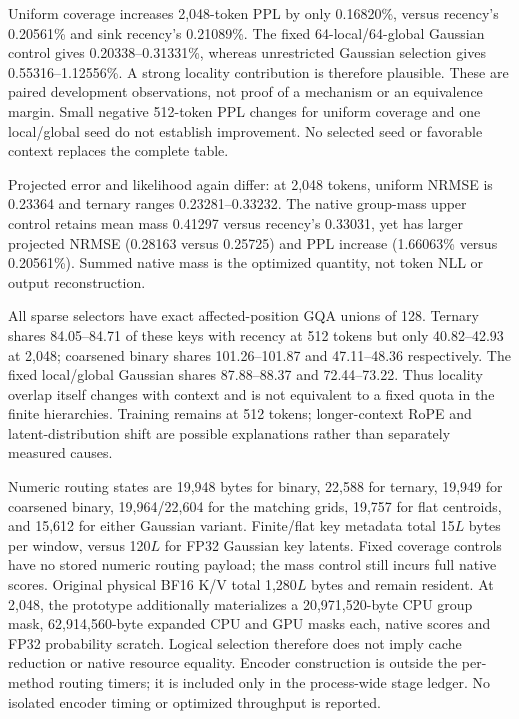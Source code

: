 \documentclass[11pt]{article}
\begin{document}
Uniform coverage increases 2,048-token PPL by only 0.16820\%, versus
recency's 0.20561\% and sink recency's 0.21089\%. The fixed 64-local/64-global
Gaussian control gives 0.20338--0.31331\%, whereas unrestricted Gaussian
selection gives 0.55316--1.12556\%. A strong locality contribution is therefore
plausible. These are paired development observations, not proof of a
mechanism or an equivalence margin. Small negative 512-token PPL changes
for uniform coverage and one local/global seed do not establish improvement.
No selected seed or favorable context replaces the complete table.

Projected error and likelihood again differ: at 2,048 tokens, uniform
NRMSE is 0.23364 and ternary ranges 0.23281--0.33232. The native group-mass
upper control retains mean mass 0.41297 versus recency's 0.33031, yet has
larger projected NRMSE (0.28163 versus 0.25725) and PPL increase (1.66063\%
versus 0.20561\%). Summed native mass is the optimized quantity, not token
NLL or output reconstruction.

All sparse selectors have exact affected-position GQA unions of 128.
Ternary shares 84.05--84.71 of these keys with recency at 512 tokens but only
40.82--42.93 at 2,048; coarsened binary shares 101.26--101.87 and
47.11--48.36 respectively. The fixed local/global Gaussian shares
87.88--88.37 and 72.44--73.22. Thus locality overlap itself changes with
context and is not equivalent to a fixed quota in the finite hierarchies.
Training remains at 512 tokens; longer-context RoPE and latent-distribution
shift are possible explanations rather than separately measured causes.

Numeric routing states are 19,948 bytes for binary, 22,588 for ternary,
19,949 for coarsened binary, 19,964/22,604 for the matching grids, 19,757
for flat centroids, and 15,612 for either Gaussian variant. Finite/flat
key metadata total 15\(L\) bytes per window, versus 120\(L\) for FP32
Gaussian key latents. Fixed coverage controls have no stored numeric
routing payload; the mass control still incurs full native scores.
Original physical BF16 K/V total 1,280\(L\) bytes and remain resident.
At 2,048, the prototype additionally materializes a 20,971,520-byte CPU
group mask, 62,914,560-byte expanded CPU and GPU masks each, native scores
and FP32 probability scratch. Logical selection therefore does not imply
cache reduction or native resource equality. Encoder construction is outside
the per-method routing timers; it is included only in the process-wide
stage ledger. No isolated encoder timing or optimized throughput is reported.
\end{document}
